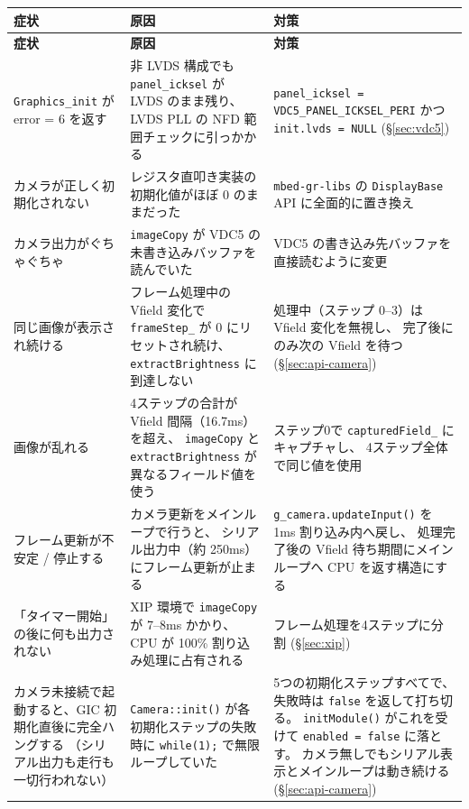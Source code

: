 \documentclass[a4paper,11pt,dvipdfmx]{jsarticle}
\begin{document}
\begin{longtable}{p{40mm} p{55mm} p{55mm}}
\toprule
\textbf{症状} & \textbf{原因} & \textbf{対策} \\
\midrule
\endfirsthead
\toprule
\textbf{症状} & \textbf{原因} & \textbf{対策} \\
\midrule
\endhead
\texttt{Graphics\_init} が error = 6 を返す &
  非 LVDS 構成でも \texttt{panel\_icksel} が LVDS のまま残り、
  LVDS PLL の NFD 範囲チェックに引っかかる &
  \texttt{panel\_icksel = VDC5\_PANEL\_ICKSEL\_PERI} かつ \texttt{init.lvds = NULL}
  (\hyperref[sec:vdc5]{§\ref*{sec:vdc5}}) \\
カメラが正しく初期化されない &
  レジスタ直叩き実装の初期化値がほぼ 0 のままだった &
  \texttt{mbed-gr-libs} の \texttt{DisplayBase} API に全面的に置き換え \\
カメラ出力がぐちゃぐちゃ &
  \texttt{imageCopy} が VDC5 の未書き込みバッファを読んでいた &
  VDC5 の書き込み先バッファを直接読むように変更 \\
同じ画像が表示され続ける &
  フレーム処理中の Vfield 変化で \texttt{frameStep\_} が 0 にリセットされ続け、
  \texttt{extractBrightness} に到達しない &
  処理中（ステップ 0--3）は Vfield 変化を無視し、
  完了後にのみ次の Vfield を待つ (\hyperref[sec:api-camera]{§\ref*{sec:api-camera}}) \\
画像が乱れる &
  4ステップの合計が Vfield 間隔（16.7ms）を超え、
  \texttt{imageCopy} と \texttt{extractBrightness} が異なるフィールド値を使う &
  ステップ0で \texttt{capturedField\_} にキャプチャし、
  4ステップ全体で同じ値を使用 \\
フレーム更新が不安定 / 停止する &
  カメラ更新をメインループで行うと、
  シリアル出力中（約 250ms）にフレーム更新が止まる &
  \texttt{g\_camera.updateInput()} を 1ms 割り込み内へ戻し、
  処理完了後の Vfield 待ち期間にメインループへ CPU を返す構造にする \\
「タイマー開始」の後に何も出力されない &
  XIP 環境で \texttt{imageCopy} が 7--8ms かかり、
  CPU が 100\% 割り込み処理に占有される &
  フレーム処理を4ステップに分割 (\hyperref[sec:xip]{§\ref*{sec:xip}}) \\
カメラ未接続で起動すると、GIC 初期化直後に完全ハングする
（シリアル出力も走行も一切行われない） &
  \texttt{Camera::init()} が各初期化ステップの失敗時に
  \texttt{while(1);} で無限ループしていた &
  5つの初期化ステップすべてで、失敗時は \texttt{false} を返して打ち切る。
  \texttt{initModule()} がこれを受けて \texttt{enabled = false} に落とす。
  カメラ無しでもシリアル表示とメインループは動き続ける
  (\hyperref[sec:api-camera]{§\ref*{sec:api-camera}}) \\
\bottomrule
\end{longtable}
\end{document}
